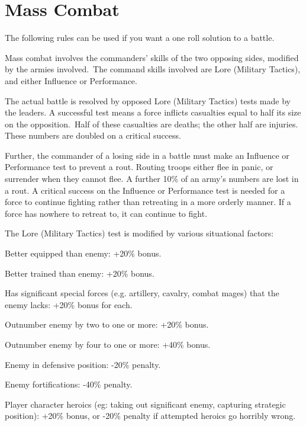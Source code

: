 



\section{Mass Combat}
The following rules can be used if you want a one roll solution to a battle.

Mass combat involves the commanders’ skills of the two opposing sides, modified by the armies involved. The command skills involved are Lore (Military Tactics), and either Influence or Performance.

The actual battle is resolved by opposed Lore (Military Tactics) tests made by the leaders. A successful test means a force inflicts casualties equal to half its size on the opposition. Half of these casualties are deaths; the other half are injuries. These numbers are doubled on a critical success.

Further, the commander of a losing side in a battle must make an Influence or Performance test to prevent a rout. Routing troops either flee in panic, or surrender when they cannot flee. A further 10\% of an army’s numbers are lost in a rout. A critical success on the Influence or Performance test is needed for a force to continue fighting rather than retreating in a more orderly manner. If a force has nowhere to retreat to, it can continue to fight.

The Lore (Military Tactics) test is modified by various situational factors:
\begin{rpg-list}
\item Better equipped than enemy: +20\% bonus.
\item Better trained than enemy: +20\% bonus.
\item Has significant special forces (e.g. artillery, cavalry, combat mages) that the enemy lacks: +20\% bonus for each.
\item Outnumber enemy by two to one or more: +20\% bonus.
\item Outnumber enemy by four to one or more: +40\% bonus.
\item Enemy in defensive position: -20\% penalty.
\item Enemy fortifications: -40\% penalty.
\item Player character heroics (eg: taking out significant enemy, capturing strategic position): +20\% bonus, or -20\% penalty if attempted heroics go horribly wrong.
\end{rpg-list}

